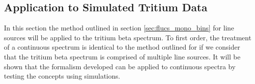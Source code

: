    %


\newpage

\subsection{Application to Simulated Tritium Data}

In this section the method outlined in section \ref{sec:flucs_mono_bins} for line sources will be applied to the tritium beta spectrum. To first order, the treatment of a continuous spectrum is identical to the method outlined for \KrCal if we consider that the tritium beta spectrum is comprised of multiple line sources. It will be shown that the formalism developed can be applied to continuous spectra by testing the concepts using simulations. 

